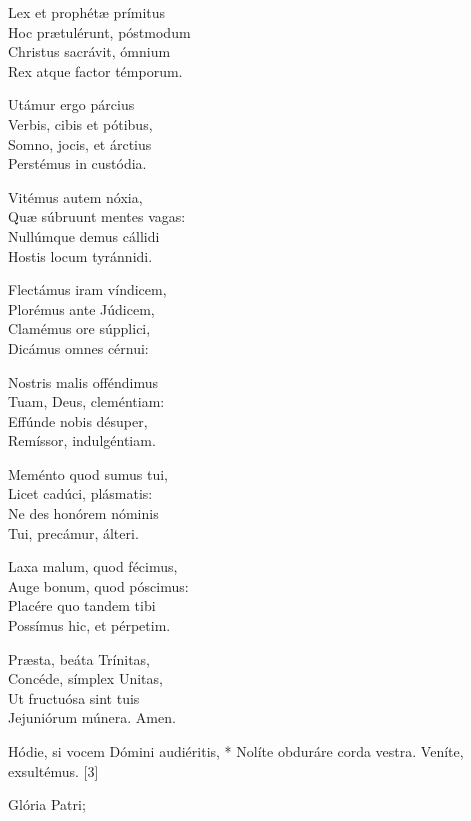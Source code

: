 Lex et prophétæ prímitus\\
Hoc prætulérunt, póstmodum\\
Christus sacrávit, ómnium\\
Rex atque factor témporum.

Utámur ergo párcius\\
Verbis, cibis et pótibus,\\
Somno, jocis, et árctius\\
Perstémus in custódia.

Vitémus autem nóxia,\\
Quæ súbruunt mentes vagas:\\
Nullúmque demus cállidi\\
Hostis locum tyránnidi.

Flectámus iram víndicem,\\
Plorémus ante Júdicem,\\
Clamémus ore súpplici,\\
Dicámus omnes cérnui:

Nostris malis offéndimus\\
Tuam, Deus, cleméntiam:\\
Effúnde nobis désuper,\\
Remíssor, indulgéntiam.

Meménto quod sumus tui,\\
Licet cadúci, plásmatis:\\
Ne des honórem nóminis\\
Tui, precámur, álteri.

Laxa malum, quod fécimus,\\
Auge bonum, quod póscimus:\\
Placére quo tandem tibi\\
Possímus hic, et pérpetim.

Præsta, beáta Trínitas,\\
Concéde, símplex Unitas,\\
Ut fructuósa sint tuis\\
Jejuniórum múnera. Amen.


 Hódie, si vocem Dómini audiéritis, * Nolíte obduráre corda vestra.  Veníte, exsultémus. [3]


 Glória Patri; 


